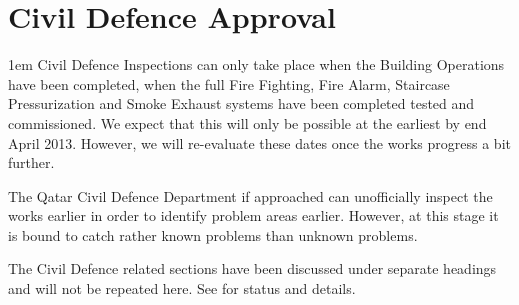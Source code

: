 \chapter{Civil Defence Approval}
\parindent1em
\label{civildefence}
Civil Defence Inspections can only take place when the Building Operations have been completed, when the full Fire Fighting,  Fire Alarm, Staircase Pressurization and Smoke Exhaust systems have been completed tested and commissioned. We expect that this will only be possible at the earliest by end April  2013. However, we will re-evaluate these dates once the works progress a bit further. 


The Qatar Civil Defence Department if approached can unofficially inspect the works earlier in order to identify problem areas earlier. However, at this stage it is bound to catch rather known problems than unknown problems.

The Civil Defence related sections have been discussed under separate headings and will not be repeated here. See  for status and details.


